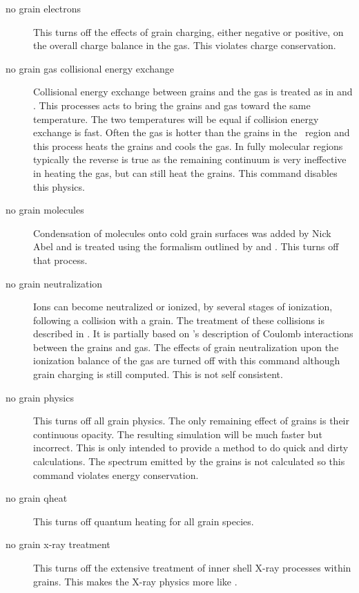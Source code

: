 \begin{description}
\item[no grain electrons]   This turns off the effects of grain charging, either
negative or positive, on the overall charge balance in the gas.  This
violates charge conservation.

\item[no grain gas collisional energy exchange]   Collisional energy exchange
between grains and the gas is treated as in \citet{VanHoof2004} and \citet{Abel2005}.   This processes acts to bring the grains and gas toward
the same temperature.  The two temperatures will be equal if collision energy
exchange is fast.  Often the gas is hotter than the grains in the \hplus\ region
and this process heats the grains and cools the gas.  In fully molecular
regions typically the reverse is true as the remaining continuum is very
ineffective in heating the gas, but can still heat the grains. This command
disables this physics.

\item[no grain molecules]  Condensation of molecules onto cold grain surfaces
was added by Nick Abel and is treated using the formalism outlined by
\citet{Hasegawa1992} and \citet{Hasegawa1993}.  This turns off that
process.

\item[no grain neutralization]  Ions can become neutralized or ionized, by
several stages of ionization, following a collision with a grain.
The treatment of these collisions is described in \citet{VanHoof2004}.
It is partially based on \citet{Draine1987}'s description of
Coulomb interactions between the grains and gas.
The effects of grain neutralization upon the ionization
balance of the gas are turned off with this command although grain charging
is still computed.  This is not self consistent.

\item[no grain physics]  This turns off all grain physics.  The only remaining
effect of grains is their continuous opacity.  The resulting simulation
will be much faster but incorrect.  This is only intended to provide a method
to do quick and dirty calculations. The spectrum emitted by the grains is
not calculated so this command violates energy conservation.

\item[no grain qheat]   This turns off quantum heating for all grain species.

\item[no grain x-ray treatment]  This turns off the
extensive treatment of inner
shell X-ray processes within grains.
This makes the X-ray physics more
like \citet{Weingartner2001a}.
\end{description}

